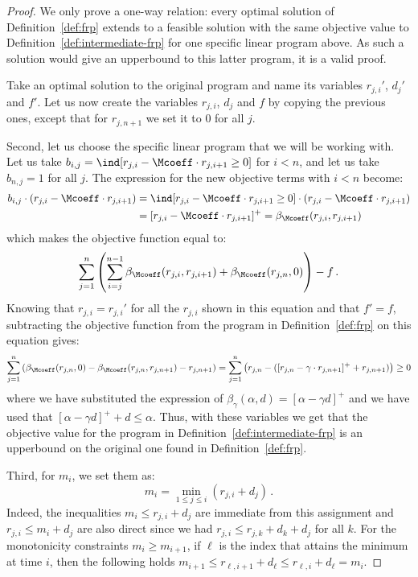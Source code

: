 \begin{proof}    
We only prove a one-way relation: every optimal solution of Definition~\ref{def:frp} extends to a feasible solution with the same objective value to Definition~\ref{def:intermediate-frp} for one specific linear program above. As such a solution would give an upperbound to this latter program, it is a valid proof. 

Take an optimal solution to the original program and name its variables $r_{j,i}'$, $d_j'$ and $f'$. Let us now create the variables $r_{j,i}$, $d_j$ and $f$ by copying the previous ones, except that for $r_{j,n+1}$ we set it to $0$ for all $j$.


Second, let us choose the specific linear program that we will be working with. Let us take $b_{i,j}=\ind[r_{j,i}-\Mcoeff \cdot r_{j,i+1}\ge0]$ for $i<n$, and let us take $b_{n,j}=1$ for all $j$. The expression for the new objective terms with $i<n$ become:
\begin{align*}
    b_{i,j} \cdot (r_{j,i} -\Mcoeff \cdot r_{j,i+1}) &= \ind[r_{j,i}-\Mcoeff \cdot r_{j,i+1}\ge0] \cdot (r_{j,i} -\Mcoeff \cdot r_{j,i+1}) \\
    &= [r_{j,i} -\Mcoeff \cdot r_{j,i+1}]^+ = \beta_{\Mcoeff} (r_{j,i},r_{j,i+1})
\end{align*}
which makes the objective function equal to:
\begin{equation*}
    \sum_{j=1}^{n} \left(\sum_{i=j}^{n-1} \beta_{\Mcoeff}(r_{j,i}, r_{j,i+1}) + \beta_{\Mcoeff}(r_{j,n},0)\right)- f\,.
\end{equation*}
Knowing that $r_{j,i}=r_{j,i}'$ for all the $r_{j,i}$ shown in this equation and that $f'=f$, subtracting the objective function from the program in Definition~\ref{def:frp} on this equation gives:
\begin{equation*}
    \sum_{j=1}^{n} \left(\beta_{\Mcoeff}(r_{j,n},0)-\beta_{\Mcoeff}(r_{j,n},r_{j,n+1}) - r_{j,n+1}\right) = \sum_{j=1}^{n} \left(r_{j,n}-([r_{j,n}-\gamma \cdot r_{j,n+1}]^+ + r_{j,n+1})\right) \geq 0
\end{equation*}
where we have substituted the expression of $\beta_{\gamma}(\alpha,d)=[\alpha-\gamma d]^+$ and we have used that $[\alpha-\gamma d]^+ + d \leq \alpha$.
Thus, with these variables we get that the objective value for the program in Definition~\ref{def:intermediate-frp} is an upperbound on the original one found in Definition~\ref{def:frp}.

Third, for $m_i$, we set them as:
\begin{equation*}\label{eq:mi-exact-definition}
    m_i = \min_{1\le j \leq i} (r_{j,i} + d_j)\,.
\end{equation*}
Indeed, the inequalities $m_i \le r_{j,i} + d_j$ are immediate from this assignment and $r_{j,i} \le m_i + d_j$ are also direct since we had $r_{j,i} \le r_{j,k}+d_k + d_j$ for all $k$. For the monotonicity constraints $m_i \ge m_{i+1}$, if $\ell$ is the index that attains the minimum at time $i$, then the following holds $m_{i+1} \le r_{\ell,i+1} + d_\ell \le r_{\ell,i} + d_\ell = m_i$. 


\end{proof}

